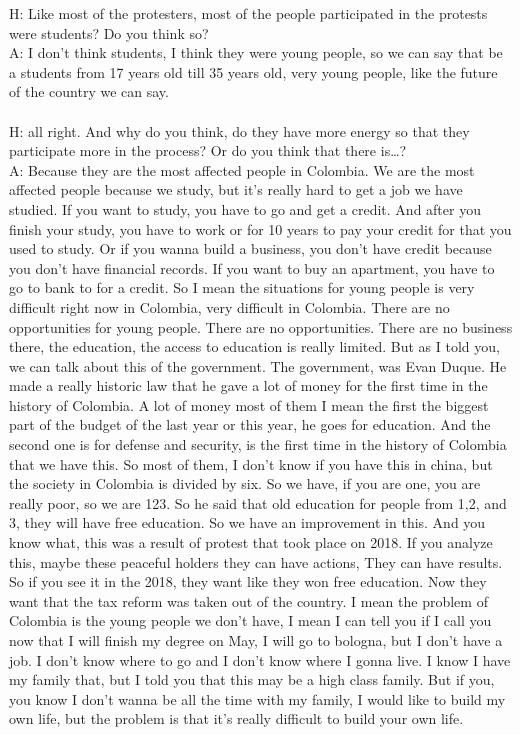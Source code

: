 \documentclass{phyasgn}\usepackage{nag}
\begin{document}
H: Like most of the protesters, most of the people participated in the protests were students? Do you think so? \\
A: I don't think students, I think they were young people, so we can say that be a students from 17 years old till 35 years old, very young people, like the future of the country we can say.\\
\\
H: all right. And why do you think, do they have more energy so that they participate more in the process? Or do you think that there is…?\\
A: Because they are the most affected people in Colombia. We are the most affected people because we study, but it's really hard to get a job we have studied. If you want to study, you have to go and get a credit. And after you finish your study, you have to work or for 10 years to pay your credit for that you used to study. Or if you wanna build a business, you don't have credit because you don't have financial records. If you want to buy an apartment, you have to go to bank to for a credit. So I mean the situations for young people is very difficult right now in Colombia, very difficult in Colombia. There are no opportunities for young people. There are no opportunities. There are no business there, the education, the access to education is really limited. But as I told you, we can talk about this of the government. The government, was Evan Duque. He made a really historic law that he gave a lot of money for the first time in the history of Colombia. A lot of money most of them I mean the first the biggest part of the budget of the last year or this year, he goes for education. And the second one is for defense and security, is the first time in the history of Colombia that we have this. So most of them, I don't know if you have this in china, but the society in Colombia is divided by six. So we have, if you are one, you are really poor, so we are 123. So he said that old education for people from 1,2, and 3, they will have free education. So we have an improvement in this. And you know what, this was a result of protest that took place on 2018. If you analyze this, maybe these peaceful holders they can have actions, They can have results. So if you see it in the 2018, they want like they won free education. Now they want that the tax reform was taken out of the country. I mean the problem of Colombia is the young people we don't have, I mean I can tell you if I call you now that I will finish my degree on May, I will go to bologna, but I don't have a job. I don't know where to go and I don't know where I gonna live. I know I have my family that, but I told you that this may be a high class family. But if you, you know I don't wanna be all the time with my family, I would like to build my own life, but the problem is that it's really difficult to build your own life.\\
\end{document}

